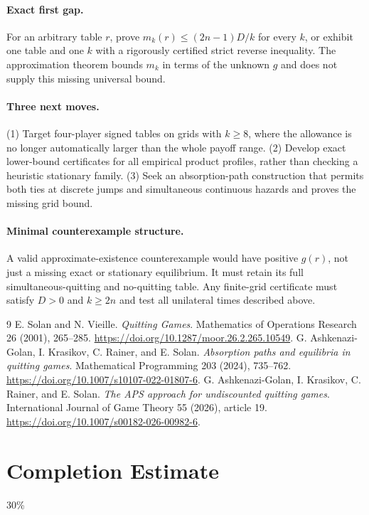 \documentclass[11pt,a4paper]{article}
\theoremstyle{definition}
\theoremstyle{remark}
\begin{document}
\paragraph{Exact first gap.}
For an arbitrary table $r$, prove $m_k(r)\leq(2n-1)D/k$ for every $k$, or exhibit one table and one $k$ with a rigorously certified strict reverse inequality. The approximation theorem bounds $m_k$ in terms of the unknown $g$ and does not supply this missing universal bound.

\paragraph{Three next moves.}
(1) Target four-player signed tables on grids with $k\geq8$, where the allowance is no longer automatically larger than the whole payoff range. (2) Develop exact lower-bound certificates for all empirical product profiles, rather than checking a heuristic stationary family. (3) Seek an absorption-path construction that permits both ties at discrete jumps and simultaneous continuous hazards and proves the missing grid bound.

\paragraph{Minimal counterexample structure.}
A valid approximate-existence counterexample would have positive $g(r)$, not just a missing exact or stationary equilibrium. It must retain its full simultaneous-quitting and no-quitting table. Any finite-grid certificate must satisfy $D>0$ and $k\geq2n$ and test all unilateral times described above.

\begin{thebibliography}{9}
 E. Solan and N. Vieille. \emph{Quitting Games}. Mathematics of Operations Research 26 (2001), 265--285. \url{https://doi.org/10.1287/moor.26.2.265.10549}.
 G. Ashkenazi-Golan, I. Krasikov, C. Rainer, and E. Solan. \emph{Absorption paths and equilibria in quitting games}. Mathematical Programming 203 (2024), 735--762. \url{https://doi.org/10.1007/s10107-022-01807-6}.
 G. Ashkenazi-Golan, I. Krasikov, C. Rainer, and E. Solan. \emph{The APS approach for undiscounted quitting games}. International Journal of Game Theory 55 (2026), article 19. \url{https://doi.org/10.1007/s00182-026-00982-6}.
\end{thebibliography}

\section{Completion Estimate}
30\%
\end{document}
